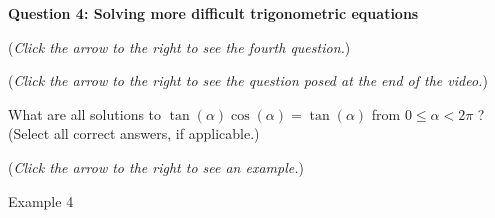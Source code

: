 \documentclass{ximera}
\begin{document}
\textbf{Question 4: Solving more difficult trigonometric equations}
\begin{question}
\begin{flushright}
{\color{blue}(\emph{Click the arrow to the right to see the fourth question.})}
\end{flushright}
\begin{center}
\begin{expandable}
{\color{blue}(\emph{Click the arrow to the right to see the question
posed at the end of the video.})}
\begin{expandable}
What are all solutions to 
$\tan(\alpha)\cos(\alpha) = \tan(\alpha)$ from $0\leq \alpha <2\pi$
? (Select all correct answers, if applicable.)
\begin{selectAll}
\choice[correct]{$\pi$}
\end{selectAll}
\begin{flushright}
{\color{blue}(\emph{Click the arrow to the right to see an example.})}
\end{flushright}
\begin{expandable}
Example 4
\end{expandable}
\end{expandable}
\end{expandable}
\end{center}
\end{question}
\end{document}
